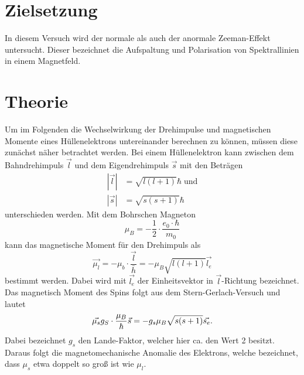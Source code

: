 \section{Zielsetzung}
In diesem Versuch wird der normale als auch der anormale Zeeman-Effekt untersucht. Dieser bezeichnet die Aufspaltung und
Polarisation von Spektrallinien in einem Magnetfeld.
\section{Theorie}
\label{sec:Theorie}
Um im Folgenden die Wechselwirkung der Drehimpulse und magnetischen Momente eines Hüllenelektrons untereinander
berechnen zu können, müssen diese zunächst näher betrachtet werden.
Bei einem Hüllenelektron kann zwischen dem Bahndrehimpuls $\vec{l}$ und dem Eigendrehimpuls $\vec{s}$ mit den Beträgen
\begin{align}
  |\vec{l}|&=\sqrt{l(l+1)}\hbar\; \text{und}\\
  |\vec{s}|&=\sqrt{s(s+1)}\hbar
\end{align}
unterschieden werden. Mit dem Bohrschen Magneton
\begin{equation}
  \mu_B=-\frac{1}{2}\cdot \frac{e_0\cdot\hbar}{m_0}
  \label{eqn:bohr}
\end{equation}
kann das magnetische Moment für den Drehimpuls als
\begin{equation}
  \vec{\mu_l}=-\mu_b\cdot\frac{\vec{l}}{\bar{h}}=-\mu_B\sqrt{l(l+1)}\vec{l_e}
  \label{eqn:magl}
\end{equation}
bestimmt werden. Dabei wird mit $\vec{l_e}$ der Einheitsvektor in $\vec{l}$-Richtung bezeichnet.
Das magnetisch Moment des Spins folgt aus dem Stern-Gerlach-Versuch und lautet
\begin{equation}
  \vec{\mu_s}\-g_S\cdot\frac{\mu_B}{\hbar}\vec{s}=-g_s \mu_B\sqrt{s(s+1)}\vec{s_e}.
  \label{eqn:mags}
\end{equation}
Dabei bezeichnet $g_s$ den Lande-Faktor, welcher hier ca. den Wert 2 besitzt. Daraus folgt die
magnetomechanische Anomalie des Elektrons, welche bezeichnet, dass $\mu_s$ etwa doppelt
so groß ist wie $\mu_l$.

